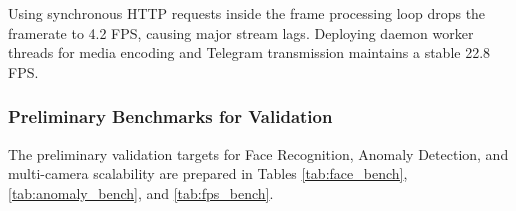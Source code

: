 \documentclass[12pt,a4paper]{article}
\begin{document}
\begin{table}[h]
    \centering
    \caption{Performance Benchmark of Notification Dispatchers (Preliminary Results)}
    \label{tab:latency_results}
\end{table}

Using synchronous HTTP requests inside the frame processing loop drops the framerate to 4.2 FPS, causing major stream lags. Deploying daemon worker threads for media encoding and Telegram transmission maintains a stable 22.8 FPS.

\subsubsection{Preliminary Benchmarks for Validation}
The preliminary validation targets for Face Recognition, Anomaly Detection, and multi-camera scalability are prepared in Tables \ref{tab:face_bench}, \ref{tab:anomaly_bench}, and \ref{tab:fps_bench}.

\begin{table}[h]
    \centering
    \caption{Target Face Verification Accuracy by Camera Viewing Angle (Expected Metrics)}
    \label{tab:face_bench}
\end{table}
\end{document}
